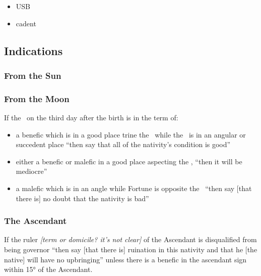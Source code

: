 \begin{itemize}[topsep=0em, itemsep=0em]
\item {} USB
\item {} cadent
\end{itemize}

\subsection{Indications}
\subsubsection{From the Sun}



\subsubsection{From the Moon}
If  the \Moon\, on the third day after the birth is in the term of:

\begin{itemize}[topsep=0em,itemsep=0em]
\item a benefic which is in a good place trine the \Moon\, while the \Moon\, is in an angular or succedent place ``then say that all of the nativity's condition is good''

\item either  a benefic or malefic in a good place aspecting the \Moon, ``then it will be mediocre''

\item a  malefic which is in an angle while Fortune is opposite the \Moon\, ``then say [that there is] no doubt that the nativity is bad''
\end{itemize}

\subsubsection{The Ascendant}
If  the ruler \textsl{[term or domicile? it's not clear]} of the Ascendant is disqualified from being governor ``then say [that there is] ruination in this nativity and that he [the native] will have no upbringing'' unless there is a benefic in the ascendant sign within 15° of the Ascendant.

